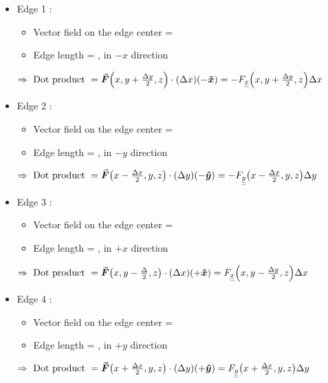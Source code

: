 \documentclass[class=article, crop=false, 12pt]{standalone}
\begin{document}
\begin{itemize}
    \item Edge 1 :
    \begin{itemize}
        \item Vector field on the edge center = 
        \item Edge length = , in $-x$ direction
    \end{itemize}
    $\Rightarrow \text{ Dot product } = \vvec{F}\qty(x,y+\frac{\Delta y}{2},z)\cdot (\Delta x)(-\hhat{x})
    = -F_{\cul[blue]{\cul[blue]{x}}}\qty(x,y+\frac{\Delta y}{2},z)\Delta x$


    \item Edge 2 :
    \begin{itemize}
        \item Vector field on the edge center = 
        \item Edge length = , in $-y$ direction
    \end{itemize}
    $\Rightarrow \text{ Dot product } = \vvec{F}\qty(x-\frac{\Delta x}{2},y,z)\cdot (\Delta y)(-\hhat{y})
    = -F_{\cul[blue]{\cul[blue]{y}}}\qty(x-\frac{\Delta x}{2},y,z)\Delta y$


    \item Edge 3 :
    \begin{itemize}
        \item Vector field on the edge center = 
        \item Edge length = , in $+x$ direction
    \end{itemize}
    $\Rightarrow \text{ Dot product } = \vvec{F}\qty(x,y-\frac{\Delta}{2},z)\cdot (\Delta x)(+\hhat{x})
    = F_{\cul[blue]{\cul[blue]{x}}}\qty(x,y-\frac{\Delta y}{2},z)\Delta x$


    \item Edge 4 :
    \begin{itemize}
        \item Vector field on the edge center = 
        \item Edge length = , in $+y$ direction
    \end{itemize}
    $\Rightarrow \text{ Dot product } = \vvec{F}\qty(x+\frac{\Delta x}{2},y,z)\cdot (\Delta y)(+\hhat{y})
    = F_{\cul[blue]{\cul[blue]{y}}}\qty(x+\frac{\Delta x}{2},y,z)\Delta y$


\end{itemize}
\end{document}
